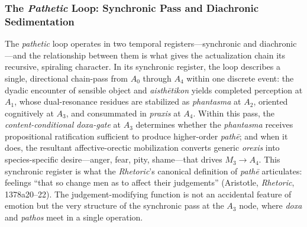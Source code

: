 \documentclass{article}
\begin{document}

\subsubsection*{The \textit{Pathetic} Loop: Synchronic Pass and Diachronic Sedimentation}

The \textit{pathetic} loop operates in two temporal registers---synchronic and diachronic---and the relationship between them is what gives the actualization chain its recursive, spiraling character. In its synchronic register, the loop describes a single, directional chain-pass from $A_0$ through $A_4$ within one discrete event: the dyadic encounter of sensible object and \textit{aisth\=etikon} yields completed perception at $A_1$, whose dual-resonance residues are stabilized as \textit{phantasma} at $A_2$, oriented cognitively at $A_3$, and consummated in \textit{praxis} at $A_4$. Within this pass, the \textit{content-conditional doxa-gate} at $A_3$ determines whether the \textit{phantasma} receives propositional ratification sufficient to produce higher-order \textit{path\=e}; and when it does, the resultant affective-orectic mobilization converts generic \textit{orexis} into species-specific desire---anger, fear, pity, shame---that drives $M_3 \rightarrow A_4$. This synchronic register is what the \textit{Rhetoric}'s canonical definition of \textit{path\=e} articulates: feelings ``that so change men as to affect their judgements'' (Aristotle, \textit{Rhetoric}, 1378a20--22). The judgement-modifying function is not an accidental feature of emotion but the very structure of the synchronic pass at the $A_3$ node, where \textit{doxa} and \textit{pathos} meet in a single operation.
\end{document}
